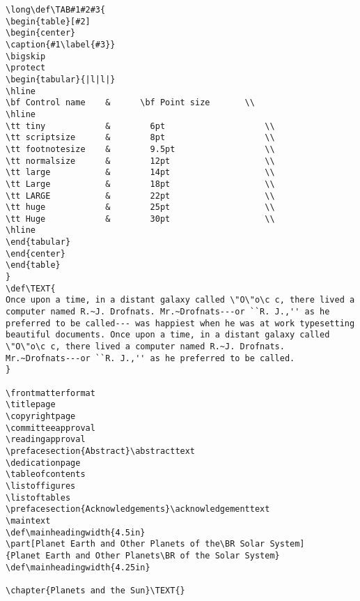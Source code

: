 \begin{verbatim}
\long\def\TAB#1#2#3{
\begin{table}[#2]
\begin{center}
\caption{#1\label{#3}}
\bigskip
\protect
\begin{tabular}{|l|l|}
\hline
\bf Control name    &      \bf Point size       \\
\hline
\tt tiny            &        6pt                    \\
\tt scriptsize      &        8pt                    \\
\tt footnotesize    &        9.5pt                  \\
\tt normalsize      &        12pt                   \\
\tt large           &        14pt                   \\
\tt Large           &        18pt                   \\
\tt LARGE           &        22pt                   \\
\tt huge            &        25pt                   \\
\tt Huge            &        30pt                   \\
\hline
\end{tabular}
\end{center}
\end{table}
}
\def\TEXT{
Once upon a time, in a distant galaxy called \"O\"o\c c, there lived a
computer named R.~J. Drofnats. Mr.~Drofnats---or ``R. J.,'' as he
preferred to be called--- was happiest when he was at work typesetting
beautiful documents. Once upon a time, in a distant galaxy called
\"O\"o\c c, there lived a computer named R.~J. Drofnats.
Mr.~Drofnats---or ``R. J.,'' as he preferred to be called.
}

\frontmatterformat
\titlepage
\copyrightpage
\committeeapproval
\readingapproval
\prefacesection{Abstract}\abstracttext
\dedicationpage
\tableofcontents
\listoffigures
\listoftables
\prefacesection{Acknowledgements}\acknowledgementtext
\maintext
\def\mainheadingwidth{4.5in}
\part[Planet Earth and Other Planets of the\BR Solar System]
{Planet Earth and Other Planets\BR of the Solar System}
\def\mainheadingwidth{4.25in}

\chapter{Planets and the Sun}\TEXT{}


\end{verbatim}
